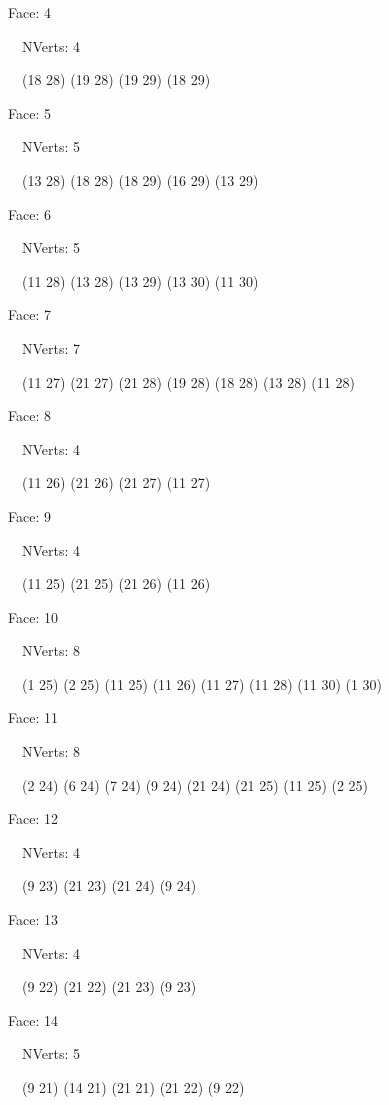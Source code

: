 \documentclass{article}
\begin{document}
{\footnotesize 

Face: 4

\   \    NVerts: 4

 \   \   (18 28) (19 28) (19 29) (18 29)}

{\footnotesize 

Face: 5

\   \    NVerts: 5

 \   \   (13 28) (18 28) (18 29) (16 29) (13 29)}

{\footnotesize 

Face: 6

\   \    NVerts: 5

 \   \   (11 28) (13 28) (13 29) (13 30) (11 30)}

{\footnotesize 

Face: 7

\   \    NVerts: 7

 \   \   (11 27) (21 27) (21 28) (19 28) (18 28) (13 28) (11 28)}

{\footnotesize 

Face: 8

\   \    NVerts: 4

 \   \   (11 26) (21 26) (21 27) (11 27)}

{\footnotesize 

Face: 9

\   \    NVerts: 4

 \   \   (11 25) (21 25) (21 26) (11 26)}

{\footnotesize 

Face: 10

\   \    NVerts: 8

 \   \   (1 25) (2 25) (11 25) (11 26) (11 27) (11 28) (11 30) (1 30)}

{\footnotesize 

Face: 11

\   \    NVerts: 8

 \   \   (2 24) (6 24) (7 24) (9 24) (21 24) (21 25) (11 25) (2 25)}

{\footnotesize 

Face: 12

\   \    NVerts: 4

 \   \   (9 23) (21 23) (21 24) (9 24)}

{\footnotesize 

Face: 13

\   \    NVerts: 4

 \   \   (9 22) (21 22) (21 23) (9 23)}

{\footnotesize 

Face: 14

\   \    NVerts: 5

 \   \   (9 21) (14 21) (21 21) (21 22) (9 22)}
\end{document}
